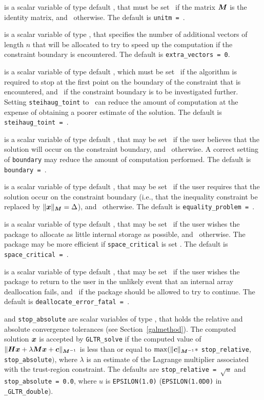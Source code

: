 \documentclass{galahad}
\newcommand{\packagename}{GL\-TR}
\newcommand{\fullpackagename}{\libraryname\_\packagename}
\begin{document}
\begin{description}
 is a scalar variable of type default \logical, that
must be set \true\ if the matrix ${\bm{M}}$ is the identity matrix, and
\false\
otherwise.
The default is {\tt unitm = \true}.

 is a scalar variable of type \integer,
that specifies the number of additional vectors of length $n$
that will be allocated to try to speed up the computation if the
constraint boundary  is encountered.
The default is {\tt extra\_vectors = 0}.

 is a scalar variable of type default \logical,
which must be set \true\ if the algorithm is required to stop at
the first point on the boundary of the constraint that is encountered,
and \false\  if the constraint boundary is to be investigated
further.  Setting {\tt steihaug\_toint} to \true\ can reduce the
amount of computation at the expense of obtaining a poorer estimate of
the solution.
The default is {\tt steihaug\_toint = \false}.

 is a scalar variable of type default \logical, that
may be set \true\ if the user believes that the solution will
occur on the constraint boundary, and \false\
otherwise. A correct setting of {\tt boundary} may reduce the amount of
computation performed.
The default is {\tt boundary = \false}.

 is a scalar variable of type default \logical, that
may be set \true\ if the user requires that the solution
occur on the constraint boundary (i.e., that the inequality constraint be
replaced by $\|{\bm{x}}\|_{{\bm{M}}} = \Delta$), and \false\ otherwise.
The default is {\tt equality\_problem = \false}.

 is a scalar variable of type default \logical, that
may be set \true\ if the user wishes the package to allocate as little
internal storage as possible, and \false\ otherwise. The package may
be more efficient if {\tt space\_critical} is set \false.
The default is {\tt space\_critical = \false}.

 is a scalar variable of type default \logical,
that may be set \true\ if the user wishes the package to return to the user
in the unlikely event that an internal array deallocation fails,
and \false\ if the package should be allowed to try to continue.
The default is {\tt deallocate\_error\_fatal = \false}.

 and {\tt stop\_absolute} are scalar variables of type
\realdp, that holds the
relative and absolute convergence tolerances (see Section~\ref{galmethod}).
The computed solution ${\bm{x}}$ is accepted by {\tt \packagename\_solve}
if the computed value of
$\|{\bm{H}} {\bm{x}} + \lambda {\bm{M}} {\bm{x}} + {\bm{c}}\|_{{{\bm{M}}^{-1}}} $ is less than or equal
to $\max (\| {\bm{c}}\|_{{\bm{M}}^{-1}} \ast$ {\tt stop\_relative},
{\tt stop\_absolute}$)$, where $\lambda$ is an estimate of the Lagrange
multiplier associated with the trust-region constraint.
The defaults are {\tt stop\_relative = $\sqrt{u}$} and
{\tt stop\_absolute = 0.0},
where $u$ is {\tt EPSILON(1.0)} ({\tt EPSILON(1.0D0)} in
{\tt \fullpackagename\_double}).


\end{description}
\end{document}

